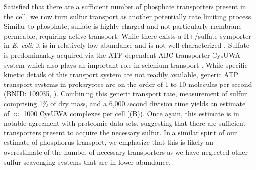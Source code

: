 Satisfied that there are a sufficient number of phosphate transporters
present in the cell, we now turn sulfur transport as another potentially rate
limiting process. Similar to phosphate, sulfate is  highly-charged
and not particularly membrane permeable, requiring active
transport. While there exists a H+/sulfate symporter in \textit{E.
coli}, it is in relatively low abundance and is not well characterized
\citep{zhang2014}. Sulfate is predominantly acquired via the ATP-dependent ABC
transporter CysUWA system which also plays an important role in selenium
transport \citep{sekowska2000, sirko1995}. While specific kinetic details of
this transport system are not readily available, generic ATP transport
systems in prokaryotes are on the order of 1 to 10 molecules per second
(BNID: 109035, \cite{milo2010}). Combining this generic
transport rate, measurement of sulfur comprising 1\% of dry mass, and a 6,000
second division time yields an estimate of $\approx$ 1000 CysUWA
complexes per cell ((B)). Once again, this estimate
is in notable agreement with proteomic data sets, suggesting that there are
sufficient transporters present to acquire the necessary sulfur. In a similar
spirit of our estimate of phosphorus transport, we emphasize that this is
likely an overestimate of the number of necessary transporters as we have
neglected other sulfur scavenging systems that are in lower
abundance.


\begin{figure}
    \begin{fullwidth}
    \end{fullwidth}
\end{figure}

